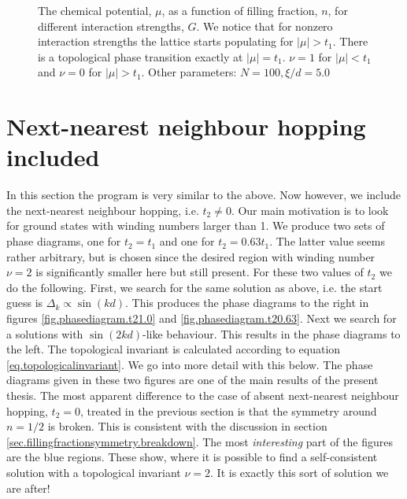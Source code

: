 \begin{figure}
\begin{center}

\caption{The chemical potential, $\mu$, as a function of filling fraction, $n$, for different interaction strengths, $G$. We notice that for nonzero interaction strengths the lattice starts populating for $|\mu| > t_1$. There is a topological phase transition exactly at $|\mu| = t_1$. $\nu = 1$ for $|\mu|< t_1$ and $\nu = 0$ for $|\mu| > t_1$. Other parameters: $N = 100, \xi / d = 5.0$}
\label{fig.mun.t20.Gdepend}
\end{center}
\end{figure}

\section{Next-nearest neighbour hopping included}
\label{sec.NNNincluded} 
In this section the program is very similar to the above. Now however, we include the next-nearest neighbour hopping, i.e. $t_2 \neq 0$. Our main motivation is to look for ground states with winding numbers larger than 1. We produce two sets of phase diagrams, one for $t_2 = t_1$ and one for $t_2 = 0.63t_1$. The latter value seems rather arbitrary, but is chosen since the desired region with winding number $\nu = 2$ is significantly smaller here but still present. For these two values of $t_2$ we do the following. First, we search for the same solution as above, i.e. the start guess is $\Delta_k \propto \sin(kd)$. This produces the phase diagrams to the right in figures \ref{fig.phasediagram.t21.0} and \ref{fig.phasediagram.t20.63}. Next we search for a solutions with $\sin(2kd)$-like behaviour. This results in the phase diagrams to the left. The topological invariant is calculated according to equation \eqref{eq.topologicalinvariant}. We go into more detail with this below. The phase diagrams given in these two figures are one of the main results of the present thesis. The most apparent difference to the case of absent next-nearest neighbour hopping, $t_2 = 0$, treated in the previous section is that the symmetry around $n = 1 / 2$ is broken. This is consistent with the discussion in section \ref{sec.fillingfractionsymmetry.breakdown}.
The most \textit{interesting} part of the figures are the blue regions. These show, where it is possible to find a self-consistent solution with a topological invariant $\nu = 2$. It is exactly this sort of solution we are after! 

